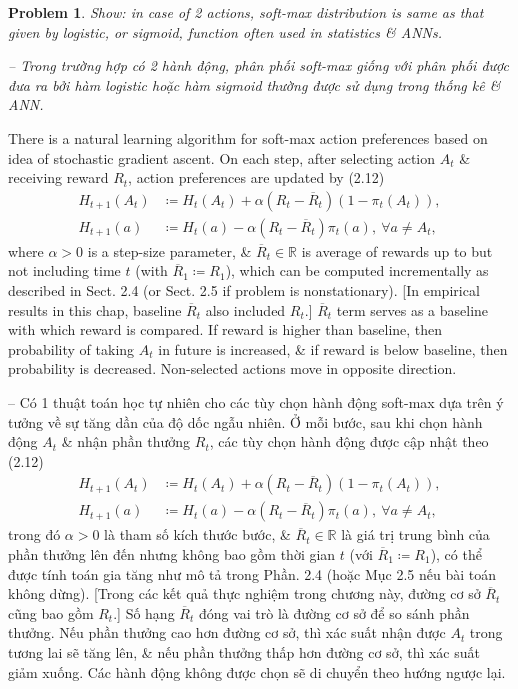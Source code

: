 \documentclass{article}
\newtheorem{problem}{Problem}
\begin{document}
\begin{itemize}
\begin{itemize}
        \begin{problem}
            Show: in case of 2 actions, soft-max distribution is same as that given by logistic, or sigmoid, function often used in statistics \& ANNs.

            -- Trong trường hợp có 2 hành động, phân phối soft-max giống với phân phối được đưa ra bởi hàm logistic hoặc hàm sigmoid thường được sử dụng trong thống kê \& ANN.
        \end{problem}
        There is a natural learning algorithm for soft-max action preferences based on idea of stochastic gradient ascent. On each step, after selecting action $A_t$ \& receiving reward $R_t$, action preferences are updated by (2.12)
        \begin{align*}
            H_{t+1}(A_t)&\coloneqq H_t(A_t) + \alpha(R_t - \overline{R}_t)(1 - \pi_t(A_t)),\\
            H_{t+1}(a)&\coloneqq H_t(a) - \alpha(R_t - \overline{R}_t)\pi_t(a),\ \forall a\ne A_t,
        \end{align*}
        where $\alpha > 0$ is a step-size parameter, \& $\overline{R}_t\in\mathbb{R}$ is average of rewards up to but not including time $t$ (with $\overline{R}_1\coloneqq R_1$), which can be computed incrementally as described in Sect. 2.4 (or Sect. 2.5 if problem is nonstationary). [In empirical results in this chap, baseline $\overline{R}_t$ also included $R_t$.] $\overline{R}_t$ term serves as a baseline with which reward is compared. If reward is higher than baseline, then probability of taking $A_t$ in future is increased, \& if reward is below baseline, then probability is decreased. Non-selected actions move in opposite direction.

        -- Có 1 thuật toán học tự nhiên cho các tùy chọn hành động soft-max dựa trên ý tưởng về sự tăng dần của độ dốc ngẫu nhiên. Ở mỗi bước, sau khi chọn hành động $A_t$ \& nhận phần thưởng $R_t$, các tùy chọn hành động được cập nhật theo (2.12)
        \begin{align*}
            H_{t+1}(A_t)&\coloneqq H_t(A_t) + \alpha(R_t - \overline{R}_t)(1 - \pi_t(A_t)),\\
            H_{t+1}(a)&\coloneqq H_t(a) - \alpha(R_t - \overline{R}_t)\pi_t(a),\ \forall a\ne A_t,
        \end{align*}
        trong đó $\alpha > 0$ là tham số kích thước bước, \& $\overline{R}_t\in\mathbb{R}$ là giá trị trung bình của phần thưởng lên đến nhưng không bao gồm thời gian $t$ (với $\overline{R}_1\coloneqq R_1$), có thể được tính toán gia tăng như mô tả trong Phần. 2.4 (hoặc Mục 2.5 nếu bài toán không dừng). [Trong các kết quả thực nghiệm trong chương này, đường cơ sở $\overline{R}_t$ cũng bao gồm $R_t$.] Số hạng $\overline{R}_t$ đóng vai trò là đường cơ sở để so sánh phần thưởng. Nếu phần thưởng cao hơn đường cơ sở, thì xác suất nhận được $A_t$ trong tương lai sẽ tăng lên, \& nếu phần thưởng thấp hơn đường cơ sở, thì xác suất giảm xuống. Các hành động không được chọn sẽ di chuyển theo hướng ngược lại.


\end{itemize}
\end{itemize}
\end{document}
